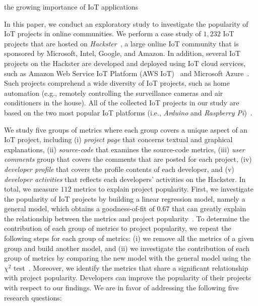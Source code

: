 the growing importance of IoT applications

In this paper, we conduct an exploratory study to investigate the popularity of
IoT projects in online communities.  We perform a case study of $1,232$ IoT
projects that are hosted on \textit{Hackster}~\cite{hackster}, a large online
IoT community that is sponsored by Microsoft, Intel, Google, and Amazon.  In
addition, several IoT projects on the Hackster are developed and deployed using
IoT cloud services, such as Amazon Web Service IoT Platform (AWS
IoT)~\cite{awsamazon} and Microsoft Azure~\cite{azure}.  Such projects
comprehend a wide diversity of IoT projects, such as home automation (e.g.,
remotely controlling the surveillance cameras and air conditioners in the
house).  All of the collected IoT projects in our study are based on the two
most popular IoT platforms (i.e., \textit{Arduino} and \textit{Raspberry
Pi})~\cite{hackster-survey-2016}. 

We study five groups of metrics where each group covers a unique aspect of an
IoT project, including (i) \textit{project page} that concerns textual and
graphical explanations, (ii) \textit{source-code} that examines the source-code
metrics, (iii) \textit{user comments} group that covers the comments that are
posted for each project, (iv) \textit{developer profile} that covers the
profile contents of each developer, and (v) \textit{developer activities}
that reflects each developers' activities on the Hackster. In total, we measure
$112$ metrics to explain project popularity.  First, we investigate the
popularity of IoT projects by building a linear regression model, namely a
general model, which obtains a goodness-of-fit of $0.67$ that can greatly
explain the relationship between the metrics and project
popularity~\cite{pearson1893contributions}.  To determine the contribution of
each group of metrics to project popularity, we repeat the following steps for
each group of metrics: (i) we remove all the metrics of a given group and build
another model, and (ii) we investigate the contribution of each group of
metrics by comparing the new model with the general model using the $\chi^2$
test~\cite{rice1989analyzing}.  Moreover, we identify the metrics that share a
significant relationship with project popularity.  Developers can improve the
popularity of their projects with respect to our findings.  We are in favor of
addressing the following five research questions:

\vspace{0.1cm}

